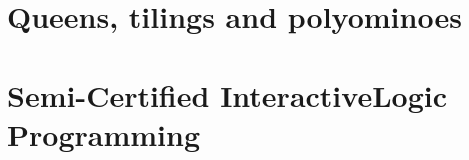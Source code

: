 \documentclass[a4paper,symmetric]{tufte-book}
\begin{document}
\chapter{Queens, tilings and polyominoes}
\label{ch:queens-tilings-polyominoes}



\chapter{Semi-Certified Interactive\newline Logic Programming} 
\label{ch:scilp}










\printindex
\end{document}
